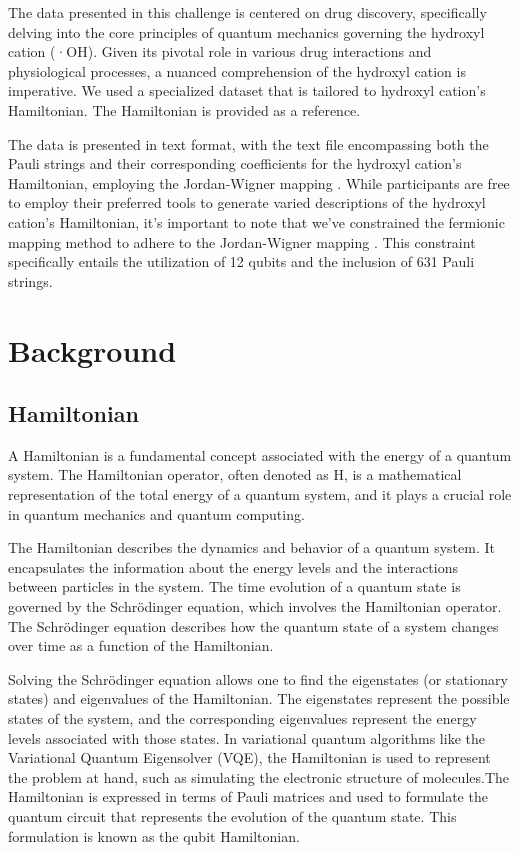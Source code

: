 \documentclass{article}
\begin{document}

The data presented in this challenge is centered on drug discovery, specifically delving into the core principles of quantum mechanics governing the hydroxyl cation (·OH). Given its pivotal role in various drug interactions and physiological processes, a nuanced comprehension of the hydroxyl cation is imperative. We used a specialized dataset that is tailored to hydroxyl cation's Hamiltonian. The Hamiltonian is provided as a reference.

The data is presented in text format, with the text file encompassing both the Pauli strings and their corresponding coefficients for the hydroxyl cation's Hamiltonian, employing the Jordan-Wigner mapping \cite{Tranter2018}. While participants are free to employ their preferred tools to generate varied descriptions of the hydroxyl cation's Hamiltonian, it's important to note that we've constrained the fermionic mapping method to adhere to the Jordan-Wigner mapping \cite{Tranter2018}. This constraint specifically entails the utilization of 12 qubits and the inclusion of 631 Pauli strings.

\section{Background}
\subsection{Hamiltonian}
A Hamiltonian is a fundamental concept associated with the energy of a quantum system. The Hamiltonian operator, often denoted as H, is a mathematical representation of the total energy of a quantum system, and it plays a crucial role in quantum mechanics and quantum computing. 

The Hamiltonian describes the dynamics and behavior of a quantum system. It encapsulates the information about the energy levels and the interactions between particles in the system. The time evolution of a quantum state is governed by the Schrödinger equation, which involves the Hamiltonian operator. The Schrödinger equation describes how the quantum state of a system changes over time as a function of the Hamiltonian.

Solving the Schrödinger equation allows one to find the eigenstates (or stationary states) and eigenvalues of the Hamiltonian. The eigenstates represent the possible states of the system, and the corresponding eigenvalues represent the energy levels associated with those states. In variational quantum algorithms like the Variational Quantum Eigensolver (VQE), the Hamiltonian is used to represent the problem at hand, such as simulating the electronic structure of molecules.The Hamiltonian is expressed in terms of Pauli matrices and used to formulate the quantum circuit that represents the evolution of the quantum state. This formulation is known as the qubit Hamiltonian.
\end{document}
